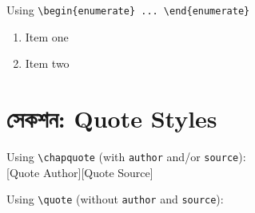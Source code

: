 \documentclass[12pt]{article}
\begin{document}
Using \verb|\begin{enumerate} ... \end{enumerate}|
\begin{enumerate}
        \item Item one
        \item Item two
\end{enumerate}    

\lipsum[3]

\section*{সেকশন: Quote Styles}

Using \verb|\chapquote| (with \verb|author| and/or \verb|source|): \\

[Quote Author][Quote Source]

Using \verb|\quote| (without \verb|author| and \verb|source|): \\





\end{document}
